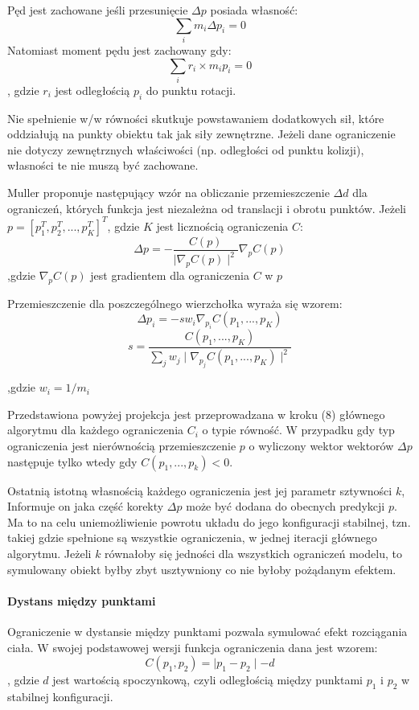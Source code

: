 Pęd jest zachowane jeśli przesunięcie $\Delta p$ posiada własność:
$$ \sum_i m_i \Delta p_i = 0$$
Natomiast moment pędu jest zachowany gdy:
$$ \sum_i r_i \times m_i p_i = 0$$, gdzie $r_i$ jest odległością $p_i$ do punktu
rotacji.

Nie spełnienie w/w równości skutkuje powstawaniem dodatkowych sił, które
oddziałują na punkty obiektu tak jak siły zewnętrzne. Jeżeli dane ograniczenie
nie dotyczy zewnętrznych właściwości (np. odległości od punktu kolizji),
własności te nie muszą być zachowane\cite{pbdyn}.

Muller proponuje następujący wzór na obliczanie przemieszczenie $\Delta d$ dla
ograniczeń, których funkcja jest niezależna od translacji i obrotu punktów.
Jeżeli $p = [ p_1^T, p_2^T, ..., p_K^T]^T$, gdzie $K$ jest licznością
ograniczenia $C$:
\begin{equation} \label{con_eq}
\Delta p = - \frac{C(p)}{\mid \nabla_p C(p) \mid^2}\nabla_p C(p)
\end{equation}
,gdzie $\nabla_p C(p)$ jest gradientem dla ograniczenia $C$ w $p$

Przemieszczenie dla poszczególnego wierzchołka wyraża się wzorem:
$$\Delta p_i = -s w_i\nabla_{p_i}C(p_1, ..., p_K)$$ 
$$ s = \frac{C(p_1, ..., p_K)}{\sum_j w_j\mid \nabla_{p_j}C(p_1, ..., p_K)
	\mid^2}$$

,gdzie $w_i = 1 / m_i$

Przedstawiona powyżej projekcja jest przeprowadzana w kroku (8) głównego
algorytmu dla każdego ograniczenia $C_i$ o typie równość.
W przypadku gdy typ ograniczenia jest nierównością przemieszczenie $p$
o wyliczony wektor wektorów $\Delta p$ następuje tylko wtedy gdy $C(p_1, ...,
		p_k) < 0$.

Ostatnią istotną własnością każdego ograniczenia jest jej parametr sztywności
$k$, Informuje on jaka część korekty $\Delta p$ może być dodana do obecnych
predykcji $p$. Ma to na celu uniemożliwienie powrotu układu do jego konfiguracji
stabilnej, tzn. takiej gdzie spełnione są wszystkie ograniczenia, w jednej
iteracji głównego algorytmu. Jeżeli $k$ równałoby się jedności dla wszystkich
ograniczeń modelu, to symulowany obiekt byłby zbyt usztywniony co nie byłoby
pożądanym efektem.

\paragraph{Dystans między punktami}
Ograniczenie w dystansie między punktami pozwala symulować efekt rozciągania
ciała. W swojej podstawowej wersji funkcja ograniczenia dana jest wzorem:
$$ C(p_1, p_2) = \mid p_1 - p_2 \mid - d$$, gdzie $d$ jest wartością
spoczynkową, czyli odległością między punktami $p_1$ i $p_2$ w stabilnej
konfiguracji.

